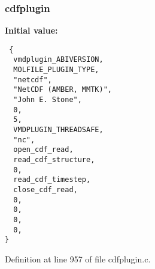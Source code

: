 \subsubsection{ cdfplugin\hspace{0.3cm}{\tt  [static]}}\label{cdfplugin_8c_a3}


{\bf Initial value:}

\footnotesize\begin{verbatim} {
  vmdplugin_ABIVERSION,                         
  MOLFILE_PLUGIN_TYPE,                          
  "netcdf",                                     
  "NetCDF (AMBER, MMTK)",                       
  "John E. Stone",                              
  0,                                            
  5,                                            
  VMDPLUGIN_THREADSAFE,                         
  "nc",                                         
  open_cdf_read,
  read_cdf_structure,
  0,
  read_cdf_timestep,
  close_cdf_read,
  0,
  0,
  0,
  0,
}\end{verbatim}\normalsize 


Definition at line 957 of file cdfplugin.c.